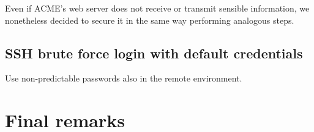 \documentclass[draft]{homework}
\begin{document}
    Even if ACME's web server does not receive or transmit sensible information, we nonetheless decided to secure it in the same way performing analogous steps.
    
    \subsection{SSH brute force login with default credentials}
    Use non-predictable passwords also in the remote environment.
    
    
    \section{Final remarks}
\end{document}
